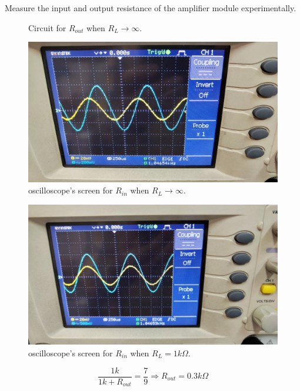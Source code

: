 \documentclass[11pt]{article}
\newcommand{\PicScale}{0.2}
\begin{document}
\begin{question}
\begin{subquestion}{Measure the input and output resistance of the amplifier module experimentally.}
{\begin{figure}[H]
                \caption{Circuit for $R_{out}$ when $R_L \to \infty$.}
            \end{figure}
            \begin{figure}[H]
                \centering
                \includegraphics[scale=\PicScale,angle=0]{Fig/49.jpeg}
                \caption{oscilloscope's screen for $R_{in}$ when $R_L \to \infty$.}
            \end{figure}
            \begin{figure}[H]
                \centering
                \includegraphics[scale=\PicScale,angle=0]{Fig/50.jpeg}
                \caption{oscilloscope's screen for $R_{in}$ when $R_L = 1k\Omega$.}
            \end{figure}
            \[
                \frac{1k}{1k + R_{out}} = \frac{7}{9} \Rightarrow R_{out} = 0.3k\Omega
            \]
        }
    \end{subquestion}


\end{question}
\end{document}
